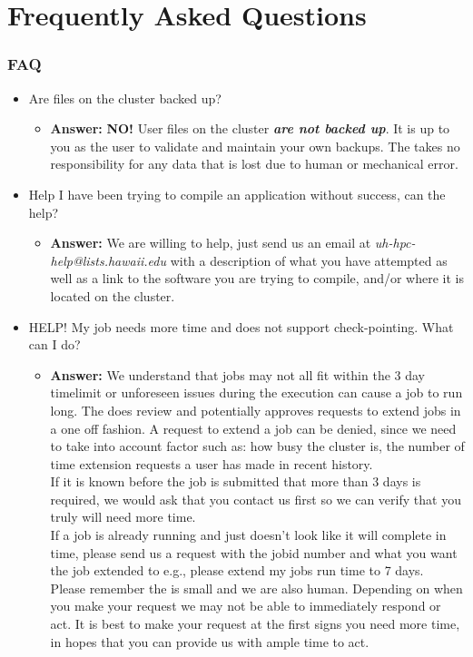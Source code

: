 \section*{Frequently Asked Questions}
\begin{frame}
\frametitle{FAQ}
\begin{itemize}\footnotesize
\item Are files on the cluster backed up?
  \begin{itemize}\tiny
  \item \textbf{Answer:} \textbf{NO!}  User files on the cluster \textbf{\emph{are not backed up}}.  It is up to you as the user to validate and maintain your own backups.  The {\citeam} takes no responsibility for any data that is lost due to human or mechanical error.  
  \end{itemize}

\item Help I have been trying to compile an application without success, can the {\citeam} help?
  \begin{itemize}\tiny
  \item \textbf{Answer:} We are willing to help, just send us an email at \textit{uh-hpc-help@lists.hawaii.edu} with a description of what you have attempted as well as a link to the software you are trying to compile, and/or where it is located on the cluster.
  \end{itemize}
  
\item HELP! My job needs more time and does not support check-pointing.  What can I do?
  \begin{itemize}\tiny
  \item \textbf{Answer:} We understand that jobs may not all fit within the 3 day timelimit or unforeseen issues during the execution can cause a job to run long.  The {\citeam} does review and potentially approves requests to extend jobs in a one off fashion.  A request to extend a job can be denied, since we need to take into account factor such as: how busy the cluster is, the number of time extension requests a user has made in recent history.\\If it is known before the job is submitted that more than 3 days is required, we would ask that you contact us first so we can verify that you truly will need more time.\\If a job is already running and just doesn't look like it will complete in time, please send us a request with the jobid number and what you want the job extended to e.g., please extend my jobs run time to 7 days.\\Please remember the {\citeam} is small and we are also human.  Depending on when you make your request we may not be able to immediately respond or act.  It is best to make your request at the first signs you need more time, in hopes that you can provide us with ample time to act.
  \end{itemize}

\end{itemize}

\end{frame}

